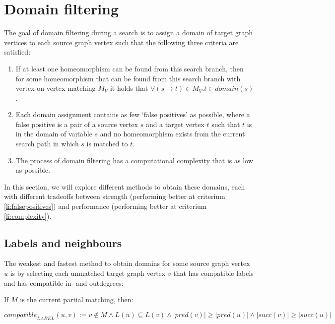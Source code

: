 \section{Domain filtering}
\label{sec:domain-filtering}
The goal of domain filtering during a search is to assign a domain of target graph vertices to each source graph vertex such that the following three criteria are satisfied:

\begin{enumerate}
\item \label{li:complete}If at least one homeomorphism can be found from this search branch, then for some homeomorphism that can be found from this search branch with vertex-on-vertex matching $M_V$ it holds that $\forall (s \to t) \in M_V . t \in \mathit{domain}(s)$.
\item \label{li:falsepositives}Each domain assignment contains as few `false positives' as possible, where a false positive is a pair of a source vertex $s$ and a target vertex $t$ such that $t$ is in the domain of variable $s$ and no homeomorphism exists from the current search path in which $s$ is matched to $t$.
\item \label{li:complexity} The process of domain filtering has a computational complexity that is as low as possible.
\end{enumerate}

In this section, we will explore different methods to obtain these domains, each with different tradeoffs between strength (performing better at criterium \ref{li:falsepositives}) and performance (performing better at criterium \ref{li:complexity}).
\subsection{Labels and neighbours}
The weakest and fastest method to obtain domains for some source graph vertex $u$ is by selecting each unmatched target graph vertex $v$ that has compatible labels and has compatible in- and outdegrees:

\begin{minipage}{\textwidth}
\begin{defn} If $M$ is the current partial matching, then:

\[\mathit{compatible}_{\mathit{LABEL}}(u, v) := v \not \in M \land L(u) \subseteq L(v) \land |\mathit{pred}(v)| \geq |\mathit{pred}(u)| \land |\mathit{succ}(v)| \geq |\mathit{succ}(u)|\]

\end{defn}
\end{minipage}

